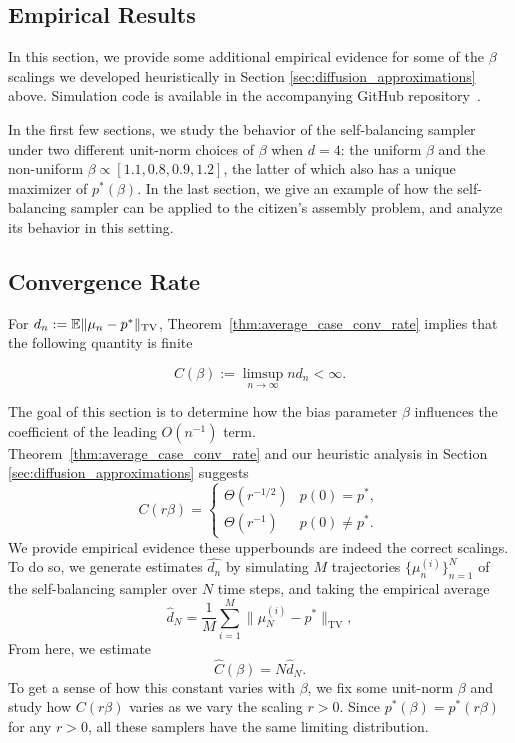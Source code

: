\newpage
\begin{subappendices}

\section{Empirical Results}
\label{sec:self_balancing_appendix}
\label{appendix:empirical_results}

In this section, we provide some additional empirical evidence for some of the $\beta$ scalings we developed heuristically in Section \ref{sec:diffusion_approximations} above. Simulation code is available in the accompanying GitHub repository~\cite{mcnulty2026_self_balancing_sampler_code}.

In the first few sections, we study the behavior of the self-balancing sampler under two different unit-norm choices of $\beta$ when $d=4$: the uniform $\beta$ and the non-uniform $\beta \propto [1.1, 0.8, 0.9, 1.2]$, the latter of which also has a unique maximizer of $p^*(\beta)$. In the last section, we give an example of how the self-balancing sampler can be applied to the citizen's assembly problem, and analyze its behavior in this setting.

\subsection{Convergence Rate}

For $d_n := \mathbb{E} \|\mu_n - p^*\|_{\operatorname{TV}}$, Theorem~\ref{thm:average_case_conv_rate} implies that the following quantity is finite

\[C(\beta) := \limsup_{n\to\infty} n d_n < \infty.\]

\noindent The goal of this section is to determine how the bias parameter 
$\beta$ influences the coefficient of the leading $O(n^{-1})$ term. 
Theorem~\ref{thm:average_case_conv_rate} and our heuristic analysis in 
Section \ref{sec:diffusion_approximations} suggests
%
\[C(r\beta) = \begin{cases}
    \Theta(r^{-1/2}) & p(0) = p^*,\\
    \Theta(r^{-1}) & p(0) \neq p^*.
\end{cases}\]
%
We provide empirical evidence these upperbounds are indeed the correct scalings. 
To do so, we generate estimates $\hat{d_n}$ by simulating $M$ trajectories 
 $\{\mu_n^{(i)}\}_{n=1}^N$ of the self-balancing sampler over $N$ time steps,
 and taking the empirical average
%
    \[\hat{d}_N = \frac{1}{M} \sum_{i=1}^M \|\mu_N^{(i)} - p^*\|_{\operatorname{TV}},\]
%
\noindent From here, we estimate
%
    \[\hat{C}(\beta) = N\hat{d}_N.\]
%
To get a sense of how this constant varies with $\beta$, we fix some unit-norm $\beta$ 
and study how $C(r\beta)$ varies as we vary the scaling $r > 0$. Since $p^*(\beta) = p^*(r\beta)$ 
for any $r>0$, all these samplers have the same limiting distribution.


\end{subappendices}
